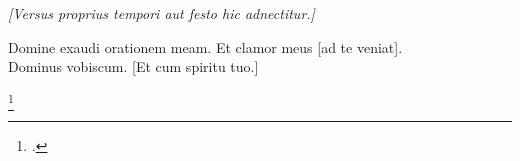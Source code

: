 \documentclass[a5paper, 12pt, openany]{book}
\newcommand{\rubrica}[1]{\textit{#1}}
\newcommand{\editorial}[1]{[#1]}
\begin{document}
\noindent\rubrica{\editorial{Versus proprius tempori aut festo hic adnectitur.}}

\noindent{}Domine exaudi orationem meam.
Et clamor meus \editorial{ad te veniat}.\\
Dominus vobiscum.
\editorial{Et cum spiritu tuo.}

\footcite[1v]{xiv_a_19}












\printbibliography

\tableofcontents
\end{document}
